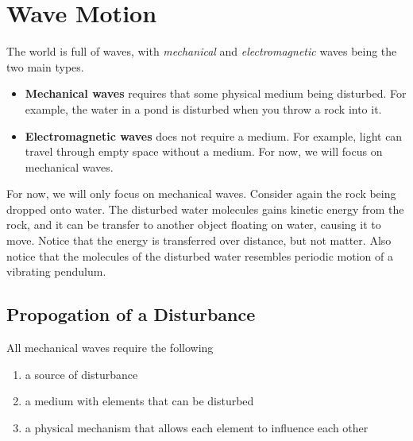 \chapter{Wave Motion}

The world is full of waves, with \textit{mechanical} and \textit{electromagnetic}
waves being the two main types. 
\begin{itemize}
    \item \textbf{Mechanical waves} requires that some physical medium being disturbed.
        For example, the water in a pond is disturbed when you throw a rock into it.
    \item \textbf{Electromagnetic waves} does not require a medium. For example, light can
        travel through empty space without a medium. For now, we will focus on mechanical waves.
\end{itemize}

For now, we will only focus on mechanical waves. Consider again the rock being dropped onto water.
The disturbed water molecules gains kinetic energy from the rock, and it can be transfer to another
object floating on water, causing it to move. Notice that the energy is transferred over distance,
but not matter. Also notice that the molecules of the disturbed water resembles periodic motion of
a vibrating pendulum.

\section{Propogation of a Disturbance}

All mechanical waves require the following
\begin{enumerate}
    \item a source of disturbance
    \item a medium with elements that can be disturbed
    \item a physical mechanism that allows each element to influence each other
\end{enumerate}


